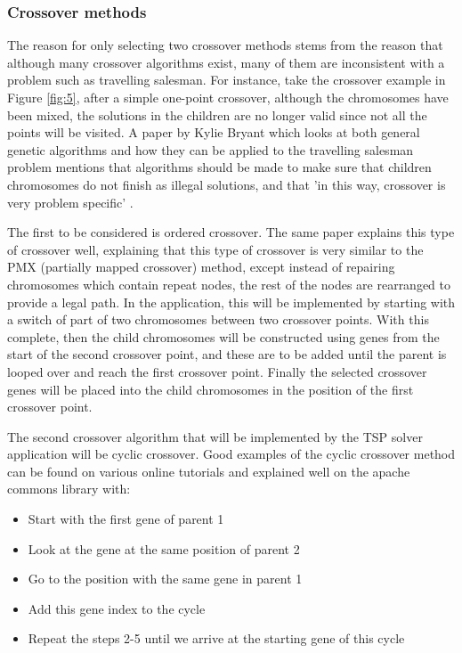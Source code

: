 \documentclass[article]{IEEEtran}
\begin{document}
\subsubsection{Crossover methods}
The reason for only selecting two crossover methods stems from the reason that although many crossover algorithms exist, many of them are inconsistent with a problem such as travelling salesman. For instance, take the crossover example in Figure \ref{fig:5}, after a simple one-point crossover, although the chromosomes have been mixed, the solutions in the children are no longer valid since not all the points will be visited. A paper by Kylie Bryant which looks at both general genetic algorithms and how they can be applied to the travelling salesman problem mentions that algorithms should be made to make sure that children chromosomes do not finish as illegal solutions, and that 'in this way, crossover is very problem specific' \cite{7}. \par
The first to be considered is ordered crossover. The same paper explains this type of crossover well, explaining that this type of crossover is very similar to the PMX (partially mapped crossover) method, except instead of repairing chromosomes which contain repeat nodes, the rest of the nodes are rearranged to provide a legal path. In the application, this will be implemented by starting with a switch of part of two chromosomes between two crossover points. With this complete, then the child chromosomes will be constructed using genes from the start of the second crossover point, and these are to be added until the parent is looped over and reach the first crossover point. Finally the selected crossover genes will be placed into the child chromosomes in the position of the first crossover point.\par
The second crossover algorithm that will be implemented by the TSP solver application will be cyclic crossover. Good examples of the cyclic crossover method can be found on various online tutorials \cite{8} and explained well on the apache commons library\cite{9} with:
\begin{itemize}
\item Start with the first gene of parent 1
\item Look at the gene at the same position of parent 2
\item Go to the position with the same gene in parent 1
\item Add this gene index to the cycle
\item Repeat the steps 2-5 until we arrive at the starting gene of this cycle
\end{itemize}
\end{document}
